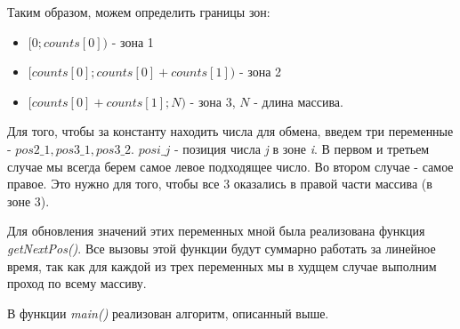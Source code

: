 Таким образом, можем определить границы зон:
\begin{itemize}
    \item $[0; counts[0])$ - зона 1
    \item $[counts[0]; counts[0] + counts[1])$ - зона 2
    \item $[counts[0] + counts[1]; N)$ - зона 3, $N$ - длина массива.
\end{itemize}

Для того, чтобы за константу находить числа для обмена, введем три переменные - \textit{$pos2\_1, pos3\_1, pos3\_2$}. $posi\_j$ - позиция числа \textit{j} в зоне \textit{i}. В первом и третьем случае мы всегда берем самое левое подходящее число. Во втором случае - самое правое. Это нужно для того, чтобы все 3 оказались в правой части массива (в зоне 3).

Для обновления значений этих переменных мной была реализована функция \textit{getNextPos()}. Все вызовы этой функции будут суммарно работать за линейное время, так как для каждой из трех переменных мы в худщем случае выполним проход по всему массиву.

В функции \textit{main()} реализован алгоритм, описанный выше.

